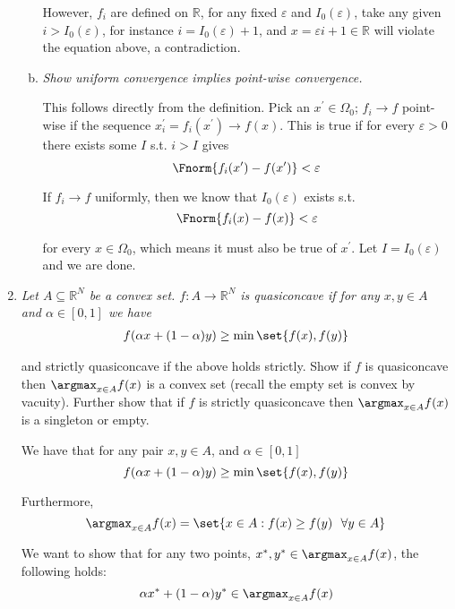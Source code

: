 \documentclass{article}
\begin{document}
\begin{enumerate}[1.]
\begin{enumerate}[a)]
        However, $f_i$ are defined on $\mathbb{R}$, for any fixed $\varepsilon$ and $I_0(\varepsilon)$, take any given $i > I_0(\varepsilon)$, for instance $i = I_0(\varepsilon) + 1$, and $x = \varepsilon i + 1 \in \mathbb{R}$ will violate the equation above, a contradiction.

      \item \textit{Show uniform convergence implies point-wise convergence.}

        \solution This follows directly from the definition. Pick an $x^\prime \in \Omega_0$; $f_i \to f$ point-wise if the sequence $x^\prime_i = f_i(x^\prime) \to f(x)$. This is true if for every $\varepsilon > 0$ there exists some $I$ s.t. $i > I$ gives
        \[
          \Fnorm{f_i(x^\prime) - f(x^\prime)} < \varepsilon
        \]

        If $f_i \to f$ uniformly, then we know that $I_0(\varepsilon)$ exists s.t.
        \[
          \Fnorm{f_i(x) - f(x)} < \varepsilon
        \]

        for every $x \in \Omega_0$, which means it must also be true of $x^\prime$. Let $I = I_0(\varepsilon)$ and we are done.
    \end{enumerate}

  \item {\itshape Let $A \subseteq \mathbb{R}^N$ be a convex set. $f: A \to \mathbb{R}^N$ is quasiconcave if for any $x, y \in A$ and $\alpha \in [0, 1]$ we have
      \begin{align*}
        f(\alpha x + (1 - \alpha) y) \ge \min\set{f(x), f(y)}
      \end{align*}

    and strictly quasiconcave if the above holds strictly. Show if $f$ is quasiconcave then $\argmax_{x \in A} f(x)$ is a convex set (recall the empty set is convex by vacuity). Further show that if $f$ is strictly quasiconcave then $\argmax_{x \in A} f(x)$ is a singleton or empty.}

    \solution We have that for any pair $x, y \in A$, and $\alpha \in [0, 1]$
      \[
        f(\alpha x + (1 - \alpha) y) \ge \min\set{f(x), f(y)}
      \]

      Furthermore,
      \[
        \argmax_{x \in A} f(x) = \set{x \in A: f(x) \ge f(y) ~~ \forall y \in A}
      \]

      We want to show that for any two points, $x^*, y^* \in \argmax_{x \in A} f(x)$, the following holds:
      \[
        \alpha x^* + (1 - \alpha) y^* \in \argmax_{x \in A} f(x)
      \]


\end{enumerate}
\end{document}
